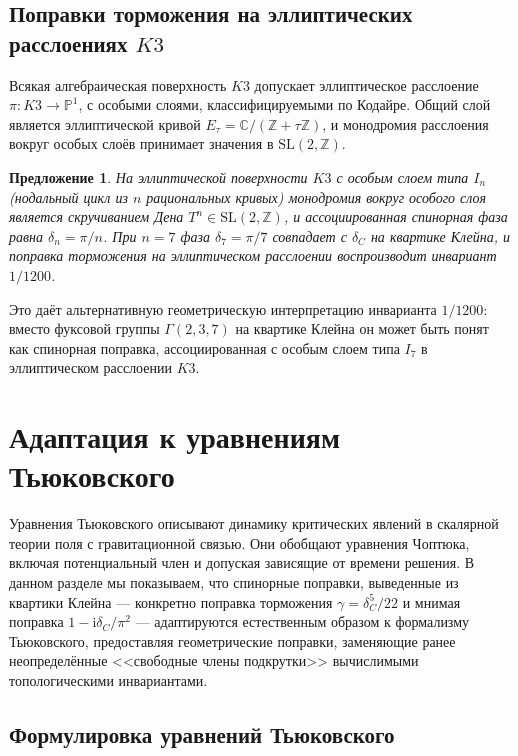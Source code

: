 \documentclass[12pt,a4paper]{article}
\newtheorem{proposition}[theorem]{Предложение}
\theoremstyle{definition}
\theoremstyle{remark}
\newcommand{\CC}{\mathbb{C}}
\newcommand{\ZZ}{\mathbb{Z}}
\newcommand{\PP}{\mathbb{P}}
\newcommand{\SL}{\mathrm{SL}}
\newcommand{\ii}{\mathrm{i}}
\begin{document}
\subsection{Поправки торможения на эллиптических расслоениях $K3$}

Всякая алгебраическая поверхность $K3$ допускает эллиптическое расслоение $\pi \colon K3 \to \PP^1$, с особыми слоями, классифицируемыми по Кодайре. Общий слой является эллиптической кривой $E_\tau = \CC/(\ZZ + \tau\ZZ)$, и монодромия расслоения вокруг особых слоёв принимает значения в $\SL(2, \ZZ)$.

\begin{proposition}
На эллиптической поверхности $K3$ с особым слоем типа $I_n$ (нодальный цикл из $n$ рациональных кривых) монодромия вокруг особого слоя является скручиванием Дена $T^n \in \SL(2, \ZZ)$, и ассоциированная спинорная фаза равна $\delta_n = \pi/n$. При $n = 7$ фаза $\delta_7 = \pi/7$ совпадает с $\delta_C$ на квартике Клейна, и поправка торможения на эллиптическом расслоении воспроизводит инвариант $1/1200$.
\end{proposition}

Это даёт альтернативную геометрическую интерпретацию инварианта $1/1200$: вместо фуксовой группы $\Gamma(2,3,7)$ на квартике Клейна он может быть понят как спинорная поправка, ассоциированная с особым слоем типа $I_7$ в эллиптическом расслоении $K3$.

\section{Адаптация к уравнениям Тьюковского}
\label{sec:tyukovsky-ru}

Уравнения Тьюковского описывают динамику критических явлений в скалярной теории поля с гравитационной связью. Они обобщают уравнения Чоптюка, включая потенциальный член и допуская зависящие от времени решения. В данном разделе мы показываем, что спинорные поправки, выведенные из квартики Клейна --- конкретно поправка торможения $\gamma = \delta_C^5/22$ и мнимая поправка $1 - \ii\delta_C/\pi^2$ --- адаптируются естественным образом к формализму Тьюковского, предоставляя геометрические поправки, заменяющие ранее неопределённые <<свободные члены подкрутки>> вычислимыми топологическими инвариантами.

\subsection{Формулировка уравнений Тьюковского}
\end{document}
